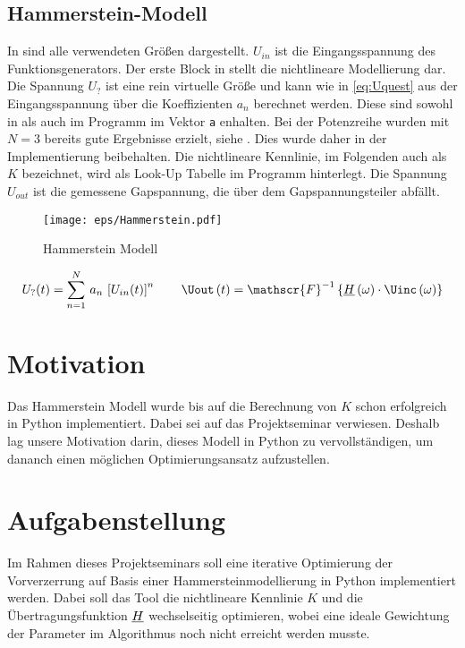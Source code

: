 \documentclass[../Report.tex]{subfiles}
\begin{document}
\subsection{Hammerstein-Modell}
\label{subsec:einf.modell_BB.hammerstein}
In  sind alle verwendeten Größen dargestellt. $U_{in}$ ist die Eingangsspannung des Funktionsgenerators. Der erste Block in  stellt die nichtlineare Modellierung dar. Die Spannung $U_{?}$ ist eine rein virtuelle Größe und kann wie in \eqref{eq:Uquest} aus der Eingangsspannung über die Koeffizienten $a_n$ berechnet werden. Diese sind sowohl in  als auch im Programm im Vektor \lstinline{a} enhalten. Bei der Potenzreihe wurden mit $N = 3$ bereits gute Ergebnisse erzielt, siehe \cite{harzheim}. Dies wurde daher in der Implementierung beibehalten. Die nichtlineare Kennlinie, im Folgenden auch als $K$ bezeichnet, wird als Look-Up Tabelle im Programm hinterlegt. Die Spannung $U_{out}$ ist die gemessene Gapspannung, die über dem Gapspannungsteiler abfällt.
\begin{figure}[H]
	\centering
	\texttt{[image: eps/Hammerstein.pdf]}
	\caption{Hammerstein Modell}
  	\label{fig:Hammerstein}
\end{figure}
\begin{align}
	U_?(t)=\sum_{n=1}^N \, a_n \, \left[ U_{in}(t) \right]^n
	\label{eq:Uquest}
	\qquad
	\Uout \oft = \mathscr{F}^{-1} \left\{ \Hcompl \ofomega \cdot \Uinc \ofomega \right\}
\end{align}

\section{Motivation}
\label{sec:einf.motivation}
Das Hammerstein Modell wurde bis auf die Berechnung von $K$ schon erfolgreich in Python implementiert. Dabei sei auf das Projektseminar \cite{PJS_Denys} verwiesen. Deshalb lag unsere Motivation darin, dieses Modell in Python zu vervollständigen, um dananch einen möglichen Optimierungsansatz aufzustellen.


\section{Aufgabenstellung}
\label{sec:einf.aufgabe}
Im Rahmen dieses Projektseminars soll eine iterative Optimierung der Vorverzerrung auf Basis einer Hammersteinmodellierung in Python implementiert werden. Dabei soll das Tool die nichtlineare Kennlinie $K$ und die Übertragungsfunktion $\underline{H}$ wechselseitig optimieren, wobei eine ideale Gewichtung der Parameter im Algorithmus noch nicht erreicht werden musste.
\end{document}

